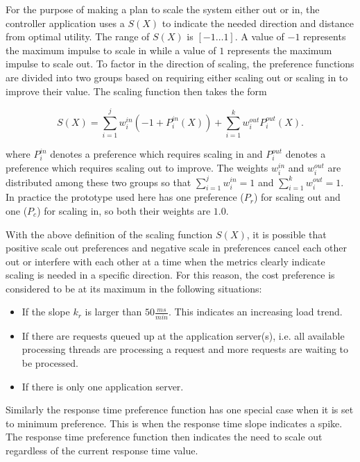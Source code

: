 \documentclass[english]{tktltiki2}
\theoremstyle{definition}
\theoremstyle{remark}
\begin{document}
For the purpose of making a plan to scale the system either out or in, the
controller application uses a  $S(X)$ to indicate the
needed direction and distance from optimal utility. The range of $S(X)$ is
$[-1\dots1]$. A value of $-1$ represents the maximum impulse to scale in while a
value of $1$ represents the maximum impulse to scale out. To factor in the
direction of scaling, the preference functions are divided into two groups based
on requiring either scaling out or scaling in to improve their value.  The
scaling function then takes the form

\begin{equation}
S(X) = \sum\limits_{i=1}^j w_{i}^{in}(-1+P_{i}^{in}(X)) + 
		\sum\limits_{i=1}^k w_{i}^{out}P_{i}^{out}(X).
\label{eq:scalingfunction}
\end{equation}

where $P_{i}^{in}$ denotes a preference which requires scaling in and
$P_{i}^{out}$ denotes a preference which requires scaling out to improve. The
weights $w_{i}^{in}$ and $w_{i}^{out}$ are distributed among these two groups
so that $\sum\limits_{i=1}^j w_{i}^{in} = 1$ and $\sum\limits_{i=1}^k
w_{i}^{out} = 1$. In practice the prototype used here has one preference
($P_{r}$) for scaling out and one ($P_{c}$) for scaling in, so both their
weights are $1.0$.

With the above definition of the scaling function $S(X)$, it is possible that
positive scale out preferences and negative scale in preferences cancel each
other out or interfere with each other at a time when the metrics clearly
indicate scaling is needed in a specific direction. For this reason, the cost
preference is considered to be at its maximum in the following situations:

\begin{itemize}
	\item{If the slope $k_{r}$ is larger than $50 \frac{ms}{min}$. This indicates an 
	increasing load trend.}
	\item{If there are requests queued up at the application server(s), i.e. all 
	available processing threads are processing a request and more requests are 
	waiting to be processed.}
	\item{If there is only one application server.}
\end{itemize}

Similarly the response time preference function has one special case when it
is set to minimum preference. This is when the response time slope indicates a
spike. The response time preference function then indicates the need to scale
out regardless of the current response time value.
\end{document}
